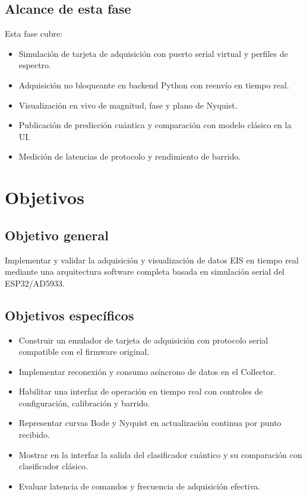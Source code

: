 \documentclass[11pt,a4paper,spanish]{book}
\begin{document}
\section{Alcance de esta fase}
Esta fase cubre:
\begin{itemize}
	\item Simulaci\'{o}n de tarjeta de adquisici\'{o}n con puerto serial virtual y perfiles de espectro.
	\item Adquisici\'{o}n no bloqueante en backend Python con reenv\'{i}o en tiempo real.
	\item Visualizaci\'{o}n en vivo de magnitud, fase y plano de Nyquist.
	\item Publicaci\'{o}n de predicci\'{o}n cu\'{a}ntica y comparaci\'{o}n con modelo cl\'{a}sico en la UI.
	\item Medici\'{o}n de latencias de protocolo y rendimiento de barrido.
\end{itemize}


\chapter{Objetivos}

\section{Objetivo general}
Implementar y validar la adquisici\'{o}n y visualizaci\'{o}n de datos EIS en tiempo real mediante una arquitectura software completa basada en simulaci\'{o}n serial del ESP32/AD5933.

\section{Objetivos espec\'{i}ficos}
\begin{itemize}
	\item Construir un emulador de tarjeta de adquisici\'{o}n con protocolo serial compatible con el firmware original.
	\item Implementar reconexi\'{o}n y consumo as\'{i}ncrono de datos en el Collector.
	\item Habilitar una interfaz de operaci\'{o}n en tiempo real con controles de configuraci\'{o}n, calibraci\'{o}n y barrido.
	\item Representar curvas Bode y Nyquist en actualizaci\'{o}n continua por punto recibido.
	\item Mostrar en la interfaz la salida del clasificador cu\'{a}ntico y su comparaci\'{o}n con clasificador cl\'{a}sico.
	\item Evaluar latencia de comandos y frecuencia de adquisici\'{o}n efectiva.
\end{itemize}
\end{document}
